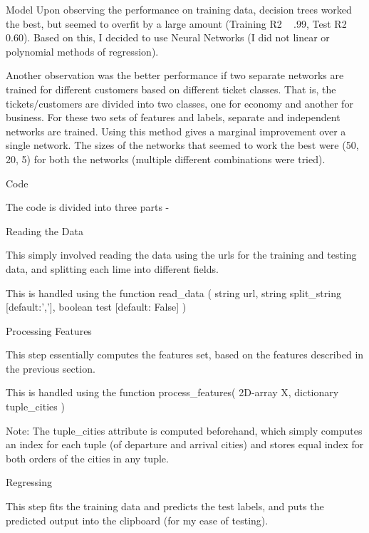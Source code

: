 \documentclass{article}
\begin{document}
\begin{question}
\begin{qsection}{Model}
		Upon observing the performance on training data, decision trees worked the best, but seemed to overfit by a large amount (Training R2 ~ .99, Test R2 ~ 0.60). Based on this, I decided to use Neural Networks (I did not linear or polynomial methods of regression).

		Another observation was the better performance if two separate networks are trained for different customers based on different ticket classes. That is, the tickets/customers are divided into two classes, one for economy and another for business. For these two sets of features and labels, separate and independent networks are trained. Using this method gives a marginal improvement over a single network. The sizes of the networks that seemed to work the best were (50, 20, 5) for both the networks (multiple different combinations were tried).
	\end{qsection}

	\begin{qsection}{Code}

		The code is divided into three parts -

		\begin{qsubsection}{Reading the Data}

			This simply involved reading the data using the urls for the training and
			testing data, and splitting each lime into different fields.

			This is handled using the function
			read\_data ( string url, string split\_string [default:','], boolean test [default: False] )
		\end{qsubsection}

		\begin{qsubsection}{Processing Features}

			This step essentially computes the features set, based on the features described
			in the previous section.

			This is handled using the function
			process\_features( 2D-array X, dictionary tuple\_cities )

			Note: The tuple\_cities attribute is computed beforehand, which simply computes
			an index for each tuple (of departure and arrival cities) and stores equal index
			for both orders of the cities in any tuple.
		\end{qsubsection}

		\begin{qsubsection}{Regressing}

			This step fits the training data and predicts the test labels, and puts the
			predicted output into the clipboard (for my ease of testing).
		\end{qsubsection}


\end{qsection}
\end{question}
\end{document}
